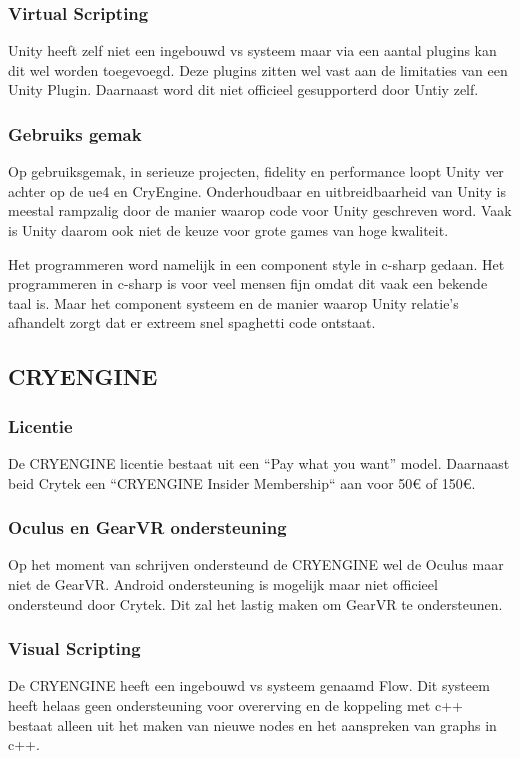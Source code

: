 \subsubsection{Virtual Scripting}
Unity heeft zelf niet een ingebouwd \gls{vs} systeem maar via een aantal plugins kan dit wel worden toegevoegd. Deze plugins zitten wel vast aan de limitaties van een Unity Plugin. Daarnaast word dit niet officieel gesupporterd door Untiy zelf.

\subsubsection{Gebruiks gemak}
Op gebruiksgemak, in serieuze projecten, fidelity en performance loopt Unity ver achter op de \gls{ue4} en CryEngine. Onderhoudbaar en uitbreidbaarheid van Unity is meestal rampzalig door de manier waarop code voor Unity geschreven word. Vaak is Unity daarom ook niet de keuze voor grote games van hoge kwaliteit. 

Het programmeren word namelijk in een component style in c-sharp gedaan. Het programmeren in c-sharp is voor veel mensen fijn omdat dit vaak een bekende taal is. Maar het component systeem en de manier waarop Unity relatie’s afhandelt zorgt dat er extreem snel spaghetti code ontstaat. 

\subsection{CRYENGINE}
\subsubsection{Licentie}
De CRYENGINE licentie bestaat uit een “Pay what you want” model. Daarnaast beid Crytek een “CRYENGINE Insider Membership“ aan voor 50€ of 150€. 

\subsubsection{Oculus en GearVR ondersteuning}
Op het moment van schrijven ondersteund de CRYENGINE wel de Oculus maar niet de GearVR. Android ondersteuning is mogelijk maar niet officieel ondersteund door Crytek. Dit zal het lastig maken om GearVR te ondersteunen.

\subsubsection{Visual Scripting}
De CRYENGINE heeft een ingebouwd \gls{vs} systeem genaamd Flow. Dit systeem heeft helaas geen ondersteuning voor overerving en de koppeling met c++ bestaat alleen uit het maken van nieuwe nodes en het aanspreken van graphs in c++.

